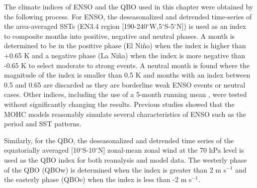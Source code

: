 The climate indices of ENSO and the QBO used in this chapter were obtained by the following process. 
For ENSO, the deseasonalized and detrended time-series of the area-averaged SSTs (EN3.4 region [190-240$^\circ$W,5$^\circ$S-5$^\circ$N]) is used as an index to composite months into positive, negative and neutral phases. 
A month is determined to be in the positive phase (El Niño) when the index is higher than +0.65 K and a negative phase (La Niña) when the index is more negative than -0.65 K to select moderate to strong events. A neutral month is found where the magnitude of the index is smaller than 0.5 K and months with an index between 0.5 and 0.65 are discarded as they are borderline weak ENSO events or neutral cases.  Other indices, including the use of a 5-month running mean \citep{trenberth1998}, were tested without significantly changing the results.   Previous studies \citep[e.g.][]{menary2018,kuhlbrodt2018}  showed that the MOHC models reasonably simulate several characteristics of ENSO such as the period and SST patterns.

Similarly, for the QBO, the deseasonalized and detrended time series of the equatorially averaged [10$^\circ$S-10$^\circ$N] zonal-mean zonal wind at the 70 hPa level is used as the QBO index for both reanalysis and model data. The westerly phase of the QBO (QBOw) is determined when the index is greater than 2 m s$^{-1}$ and the easterly phase (QBOe) when the index is less than -2 m s$^{-1}$. 


% 



